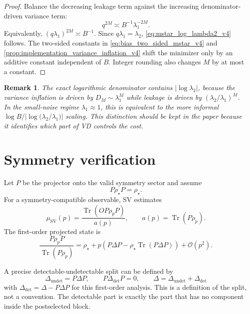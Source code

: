 \documentclass[11pt]{article}
\newtheorem{remark}{Remark}
\DeclareMathOperator{\Tr}{Tr}
\newcommand{\1}{\mathbf{1}}
\newcommand{\OO}{\mathcal{O}}
\newcommand{\abs}[1]{\left\lvert #1 \right\rvert}
\begin{document}
\begin{proof}
Balance the decreasing leakage term against the increasing denominator-driven variance term:
\begin{equation}
    q^{2M}\asymp B^{-1}\lambda_1^{-2M}.
\end{equation}
Equivalently, \((q\lambda_1)^{2M}\asymp B^{-1}\).  Since \(q\lambda_1=\lambda_2\), \cref{eq:mstar_log_lambda2_v4} follows.  The two-sided constants in \cref{eq:bias_two_sided_mstar_v4} and \cref{prop:implementation_variance_inflation_v4} shift the minimizer only by an additive constant independent of \(B\).  Integer rounding also changes \(M\) by at most a constant.
\end{proof}

\begin{remark}
The exact logarithmic denominator contains \(\abs{\log\lambda_2}\), because the variance inflation is driven by \(D_M\sim\lambda_1^M\) while leakage is driven by \((\lambda_2/\lambda_1)^M\).  In the small-noise regime \(\lambda_1\approx1\), this is equivalent to the more informal \(\log B/\abs{\log\!\bigl(\lambda_2/\lambda_1\bigr)}\) scaling.  This distinction should be kept in the paper because it identifies which part of VD controls the cost.
\end{remark}

\section{Symmetry verification}

Let \(P\) be the projector onto the valid symmetry sector and assume
\begin{equation}
    P\rho_\star P=\rho_\star.
\end{equation}
For a symmetry-compatible observable, SV estimates
\begin{equation}
    \mu_{\mathrm{SV}}(p)=\frac{\Tr(OP\rho_pP)}{a(p)},
    \qquad
    a(p)=\Tr(P\rho_p).
    \label{eq:sv_population_v2}
\end{equation}
The first-order projected state is
\begin{equation}
    \frac{P\rho_pP}{\Tr(P\rho_p)}
    =\rho_\star+p\left(P\Delta P-\rho_\star\Tr(P\Delta P)\right)+\OO(p^2).
    \label{eq:sv_projected_state_expansion}
\end{equation}

A precise detectable-undetectable split can be defined by
\begin{equation}
    \Delta_{\mathrm{undet}}=P\Delta P,
    \qquad
    P\Delta_{\mathrm{det}}P=0,
    \qquad
    \Delta=\Delta_{\mathrm{undet}}+\Delta_{\mathrm{det}}
\end{equation}
with \(\Delta_{\mathrm{det}}=\Delta-P\Delta P\) for this first-order analysis.  This is a definition of the split, not a convention.  The detectable part is exactly the part that has no component inside the postselected block.
\end{document}

